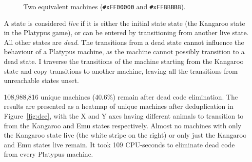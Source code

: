 \begin{figure}
  \begin{center}
  \end{center}
  \caption{Two equivalent machines (\texttt{\#xFF00000} and \texttt{\#xFFBBBBB}).}
  \label{fig:dead-states}
\end{figure}

A state is considered \emph{live} if it is either the initial state
state (the Kangaroo state in the Platypus game), or can be entered by
transitioning from another live state. All other states are \emph{dead}.
The transitions from a dead state cannot influence the behaviour
of a Platypus machine, as the machine cannot possibly transition
to a dead state. I traverse the transitions of the machine starting from
the Kangaroo state and copy transitions to another machine, leaving
all the transitions from unreachable states unset. 

108,988,816 unique machines (40.6\%) remain after dead code elimination.
The results are presented as a heatmap of unique machines after
deduplication in Figure~\ref{fig:dce}, with the X and Y axes having
different animals to transition to from the Kangaroo and Emu
states respectively. Almost no machines with only the Kangaroo state
live (the white stripe on the right) or only just the Kangaroo and
Emu states live remain. It took 109 CPU-seconds to eliminate
dead code from every Platypus machine.


